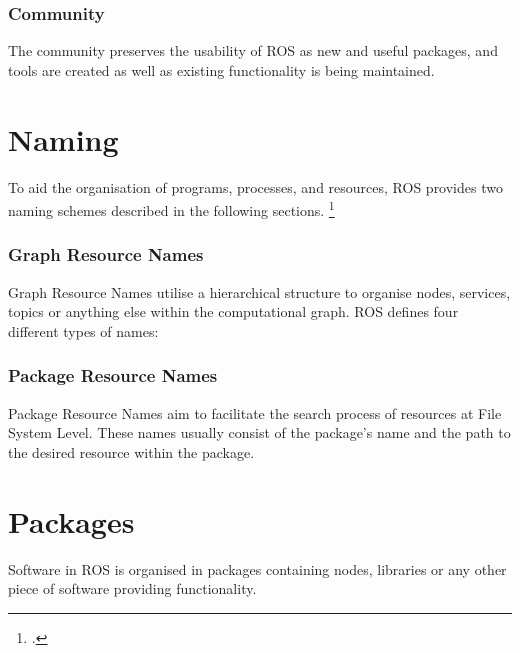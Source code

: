 \subsubsection{Community}
The community preserves the usability of ROS as new and useful packages, and tools are created as well as existing functionality is being maintained.

\section{Naming}
To aid the organisation of programs, processes, and resources, ROS provides two naming schemes described in the following sections. \citereset\footcite{openSourceRoboticsFoundationConceptsNodate}

\subsubsection{Graph Resource Names}
Graph Resource Names utilise a hierarchical structure to organise nodes, services, topics or anything else within the computational graph. ROS defines four different types of names:

\subsubsection{Package Resource Names}
Package Resource Names aim to facilitate the search process of resources at File System Level. These names usually consist of the package's name and the path to the desired resource within the package. 

\section{Packages}
Software in ROS is organised in packages containing nodes, libraries or any other piece of software providing functionality.

